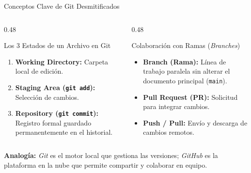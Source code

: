 \documentclass[aspectratio=169, 10pt]{beamer}
\begin{document}
\begin{frame}{Conceptos Clave de Git Desmitificados}
  \begin{columns}[T]
    \begin{column}{0.48\textwidth}
      \begin{block}{Los 3 Estados de un Archivo en Git}
        \small
        \begin{enumerate}
          \item \textbf{Working Directory:} Carpeta local de edición.
          \item \textbf{Staging Area (\texttt{git add}):} Selección de cambios.
          \item \textbf{Repository (\texttt{git commit}):} Registro formal guardado permanentemente en el historial.
        \end{enumerate}
      \end{block}
    \end{column}

    \begin{column}{0.48\textwidth}
      \begin{block}{Colaboración con Ramas (\textit{Branches})}
        \small
        \begin{itemize}
          \item \textbf{Branch (Rama):} Línea de trabajo paralela sin alterar el documento principal (\texttt{main}).
          \item \textbf{Pull Request (PR):} Solicitud para integrar cambios.
          \item \textbf{Push / Pull:} Envío y descarga de cambios remotos.
        \end{itemize}
      \end{block}
    \end{column}
  \end{columns}

  \vspace{0.15cm}
  \begin{tcolorbox}[colback=pucpLightBlue!50,colframe=pucpBlue,boxrule=0.5pt,arc=1.5mm,top=1.5mm,bottom=1.5mm]
    \footnotesize\textbf{Analogía:} \textit{Git} es el motor local que gestiona las versiones; \textit{GitHub} es la plataforma en la nube que permite compartir y colaborar en equipo.
  \end{tcolorbox}
\end{frame}
\end{document}
